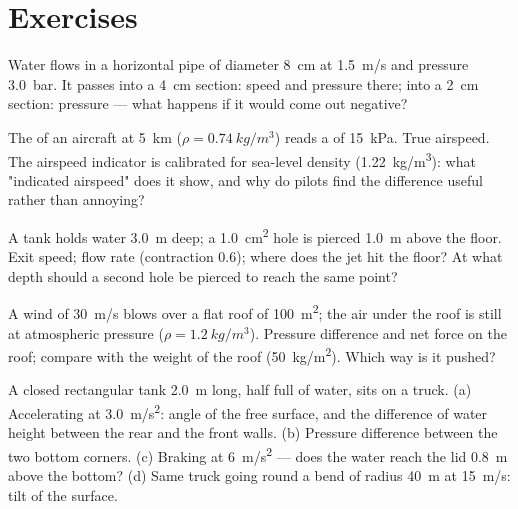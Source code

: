 \section{Exercises}

\begin{exercise}[$\star$]\label{exo:b2:euler-bernoulli:1}
Water flows in a horizontal pipe of diameter \qty{8}{cm} at \qty{1.5}{m/s}
and pressure \qty{3.0}{bar}. It passes into a \qty{4}{cm} section: speed
and pressure there; into a \qty{2}{cm} section: pressure --- what happens
if it would come out negative?
\end{exercise}

\begin{exercise}[$\star$]\label{exo:b2:euler-bernoulli:2}
The  of an aircraft at \qty{5}{km} ($\rho = \qty{0.74}{kg/m^3}$)
reads a  of \qty{15}{kPa}. True airspeed. The airspeed
indicator is calibrated for sea-level density (\qty{1.22}{kg/m^3}): what
"indicated airspeed" does it show, and why do pilots find the
difference useful rather than annoying?
\end{exercise}

\begin{exercise}[$\star$]\label{exo:b2:euler-bernoulli:3}
A tank holds water \qty{3.0}{m} deep; a \qty{1.0}{cm^2} hole is pierced
\qty{1.0}{m} above the floor. Exit speed; flow rate (contraction $0.6$);
where does the jet hit the floor? At what depth should a second hole be
pierced to reach the same point?
\end{exercise}

\begin{exercise}[$\star$]\label{exo:b2:euler-bernoulli:4}
A wind of \qty{30}{m/s} blows over a flat roof of \qty{100}{m^2}; the air
under the roof is still at atmospheric pressure ($\rho = \qty{1.2}{kg/m^3}$).
Pressure difference and net force on the roof; compare with the weight
of the roof (\qty{50}{kg/m^2}). Which way is it pushed?
\end{exercise}

\begin{exercise}[$\star\star$]\label{exo:b2:euler-bernoulli:5}
A closed rectangular tank \qty{2.0}{m} long, half full of water, sits on a
truck. (a) Accelerating at \qty{3.0}{m/s^2}: angle of the free surface,
and the difference of water height between the rear and the front
walls. (b) Pressure difference between the two bottom corners. (c)
Braking at \qty{6}{m/s^2} --- does the water reach the lid \qty{0.8}{m} above
the bottom? (d) Same truck going round a bend of radius \qty{40}{m} at
\qty{15}{m/s}: tilt of the surface.
\end{exercise}


